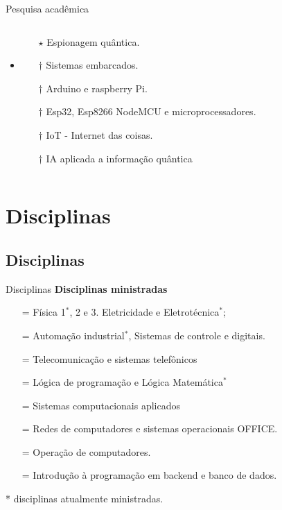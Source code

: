 \documentclass{beamer}
\begin{document}
\begin{frame}{Pesquisa acadêmica}
\begin{columns}[T]
\begin{column}{.85\textwidth}
\begin{itemize}
\begin{itemize}
                    \item [$\star$] Espionagem quântica.
                \end{itemize}
                \item<1-> [+] [EM APERFEIÇOAMENTO]
                \begin{itemize}
                    \item [$\dagger$] Sistemas embarcados.
                    \item [$\dagger$] Arduino e raspberry Pi.
                    \item [$\dagger$] Esp32, Esp8266 NodeMCU e microprocessadores.
                    \item [$\dagger$] IoT - Internet das coisas.
                    \item [$\dagger$] IA aplicada a informação quântica
                \end{itemize} 
            \end{itemize}
        \end{column}
    \end{columns}
\end{frame}
\section{Disciplinas}
\subsection{Disciplinas}
\begin{frame}{Disciplinas}
    \textbf{Disciplinas ministradas}
        \begin{itemize}
            \item [=] Física 1$^*$, 2 e 3. Eletricidade e Eletrotécnica$^*$;
            \item [=] Automação industrial$^*$, Sistemas de controle e digitais.
            \item [=] Telecomunicação e sistemas telefônicos
            \item [=] Lógica de programação e Lógica Matemática$^*$
            \item [=] Sistemas computacionais aplicados
            \item [=] Redes de computadores e sistemas operacionais OFFICE.
            \item [=] Operação de computadores.
            \item [=] Introdução à programação em backend e banco de dados.
        \end{itemize}
        * disciplinas atualmente ministradas.
\end{frame}
%
\end{document}
